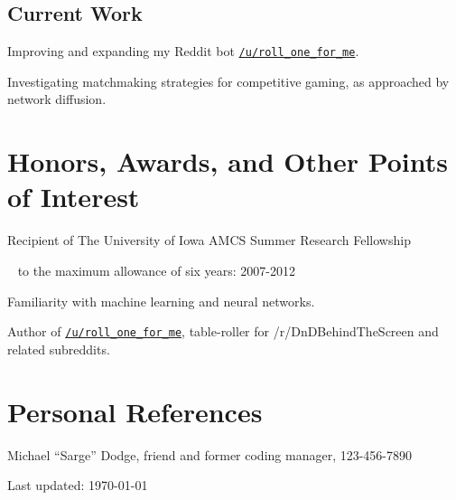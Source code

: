\documentclass[10pt,letterpaper]{article}
\newcommand\ttt\texttt
\renewenvironment{itemize}{
  \begin{list}{}{
    \setlength{\leftmargin}{1.5em}
    \setlength{\itemsep}{0.25em}
    \setlength{\parskip}{0pt}
    \setlength{\parsep}{0.25em}
  }
}{
  \end{list}
}
\begin{document}

\subsection*{Current Work}
\begin{itemize}
\item Improving and expanding my Reddit bot \href{
  https://www.reddit.com/user/roll_one_for_me }{
  \ttt{/u/roll\_one\_for\_me}}.
\item Investigating matchmaking strategies for competitive gaming, as approached by network diffusion.
\end{itemize}


\section*{Honors, Awards, and Other Points of Interest}
\begin{itemize}
\item Recipient of The University of Iowa AMCS Summer Research
  Fellowship \par ~ to the maximum allowance of six years: 2007-2012
\item Familiarity with machine learning and neural networks.
\item Author of \href{https://www.reddit.com/user/roll_one_for_me}{
  \ttt{/u/roll\_one\_for\_me}}, table-roller for /r/DnDBehindTheScreen and
  related subreddits.
\end{itemize}

\section*{Personal References}
\begin{itemize}
  \item Michael ``Sarge'' Dodge, friend and former coding manager, 123-456-7890
\end{itemize}

\vfill
\begin{center}
  \begin{small}
    Last updated: \today
  \end{small}
\end{center}
\end{document}
